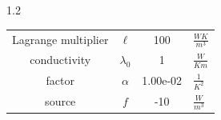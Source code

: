 \documentclass[preview]{standalone}
\begin{document}
\begin{spacing}{1.2}
\begin{tabular}{cccl}
\toprule
Lagrange multiplier & $\ell$ & 100 & $\frac{W K}{m^3}$ \\ 
conductivity & $\lambda_{0}$ & 1 & $\frac{W}{K m}$ \\ 
factor & $\alpha$ & 1.00e-02 & $\frac{1}{K^2}$ \\ 
source & $f$ & -10 & $\frac{W}{m^3}$ \\ 
\bottomrule
\end{tabular}
\end{spacing}
\end{document}

